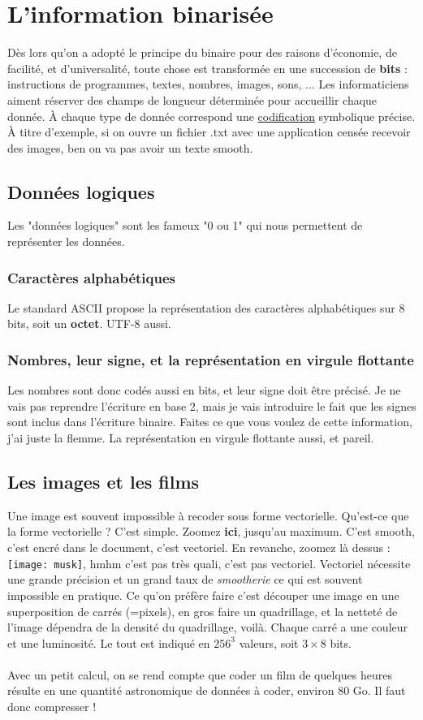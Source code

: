 \documentclass[12pt,a4paper]{report}
\begin{document}
\section{L'information binarisée}
Dès lors qu'on a adopté le principe du binaire pour des raisons d'économie, de facilité, et d'universalité, toute chose est transformée en une succession de \textbf{bits} : instructions de programmes, textes, nombres, images, sons, ... Les informaticiens aiment réserver des champs de longueur déterminée pour accueillir chaque donnée. À chaque type de donnée correspond une \underline{codification} symbolique précise. À titre d'exemple, si on ouvre un fichier .txt avec une application censée recevoir des images, ben on va pas avoir un texte smooth.
\subsection{Données logiques}
Les "données logiques" sont les fameux "0 ou 1" qui nous permettent de représenter les données.
\subsubsection{Caractères alphabétiques}
Le standard ASCII propose la représentation des caractères alphabétiques sur 8 bits, soit un \textbf{octet}. UTF-8 aussi.
\subsubsection{Nombres, leur signe, et la représentation en virgule flottante}
Les nombres sont donc codés aussi en bits, et leur signe doit être précisé. Je ne vais pas reprendre l'écriture en base 2, mais je vais introduire le fait que les signes sont inclus dans l'écriture binaire. Faites ce que vous voulez de cette information, j'ai juste la flemme. La représentation en virgule flottante aussi, et pareil.
\subsection{Les images et les films}
Une image est souvent impossible à recoder sous forme vectorielle. Qu'est-ce que la forme vectorielle ? C'est simple. Zoomez \textbf{ici}, jusqu'au maximum. C'est smooth, c'est encré dans le document, c'est vectoriel. En revanche, zoomez là dessus : \texttt{[image: musk]}, hmhm c'est pas très quali, c'est pas vectoriel. Vectoriel nécessite une grande précision et un grand taux de \textit{smootherie} ce qui est souvent impossible en pratique. Ce qu'on préfère faire c'est découper une image en une superposition de carrés (=pixels), en gros faire un quadrillage, et la netteté de l'image dépendra de la densité du quadrillage, voilà. Chaque carré a une couleur et une luminosité. Le tout est indiqué en $256^3$ valeurs, soit $3 \times 8$ bits.\\
\\
Avec un petit calcul, on se rend compte que coder un film de quelques heures résulte en une quantité astronomique de données à coder, environ 80 Go. Il faut donc compresser !
\end{document}
